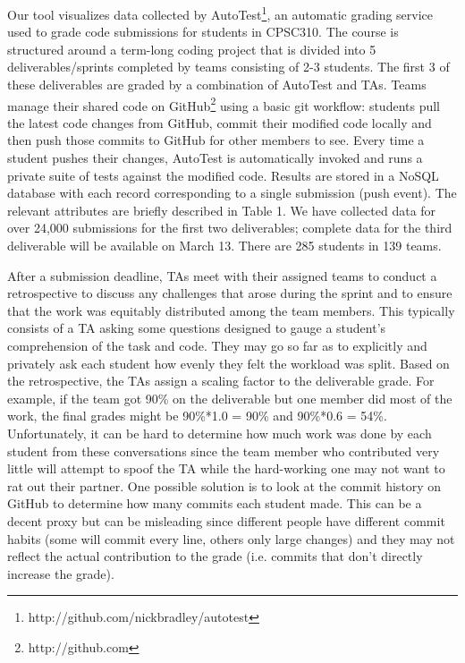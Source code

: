 \documentclass[../manifest.tex]{subfiles}
\begin{document}
Our tool visualizes data collected by AutoTest\footnote{http://github.com/nickbradley/autotest},
an automatic grading service used to grade code submissions for students in
CPSC310. The course is structured around a term-long coding project that is
divided into 5 deliverables/sprints completed by teams consisting of 2-3 students.
The first 3 of these deliverables are graded by a combination of AutoTest and TAs.
Teams manage their shared code on GitHub\footnote{http://github.com}
using a basic git workflow: students pull the latest code changes from GitHub,
commit their modified code locally and then push those commits to GitHub for
other members to see. Every time a student pushes their changes, AutoTest is
automatically invoked and runs a private suite of tests against the modified
code. Results are stored in a NoSQL database with each record corresponding to a
single submission (push event). The relevant attributes are briefly described in
Table 1. We have collected data for over 24,000 submissions for the first two
deliverables; complete data for the third deliverable will be available on March
13. There are 285 students in 139 teams.

After a submission deadline, TAs meet with their assigned
teams to conduct a retrospective to discuss any challenges that arose
during the sprint and to ensure that the work was equitably distributed among the
team members. This typically consists of a TA asking some questions designed to
gauge a student's comprehension of the task and code. They may go so far as to
explicitly and privately ask each student how evenly they felt the workload was
split. Based on the retrospective, the TAs assign a scaling factor to the deliverable grade. For example, if
the team got 90\% on the deliverable but one member did most of the work, the final
grades might be 90\%*1.0 = 90\% and 90\%*0.6 = 54\%. Unfortunately, it can be hard
to determine how much work was done by each student from these conversations since
the team member who contributed very little will attempt to spoof the TA while the
hard-working one may not want to rat out their partner. One possible solution is
to look at the commit history on GitHub to determine how many commits each student
made. This can be a decent proxy but can be misleading since different people have
different commit habits (some will commit every line, others only large changes)
and they may not reflect the actual contribution to the grade (i.e. commits that
don't directly increase the grade).
\end{document}
